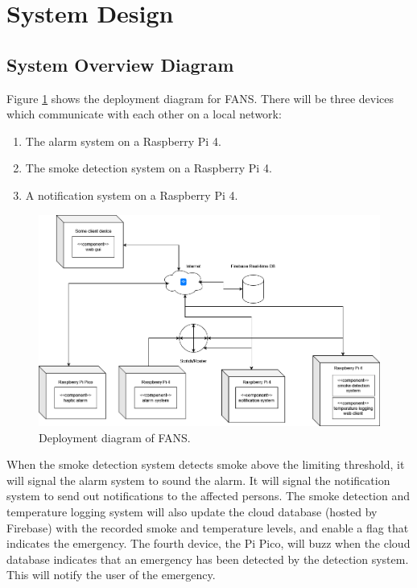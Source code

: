 \section{System Design}

\subsection{System Overview Diagram}

Figure \ref{fig:deployment} shows the deployment diagram for FANS. There will be three devices which communicate with
each other on a local network:

\begin{enumerate}
    \item The alarm system on a Raspberry Pi 4.
    \item The smoke detection system on a Raspberry Pi 4.
    \item A notification system on a Raspberry Pi 4.
\end{enumerate}

\begin{figure}[H]
    \centering
    \includegraphics[width=\linewidth]{../assets/FANSDeployment.png}
    \caption{Deployment diagram of FANS.}
    \label{fig:deployment}
\end{figure}

When the smoke detection system detects smoke above the limiting threshold, it will signal the alarm system to sound
the alarm. It will signal the notification system to send out notifications to the affected persons. The smoke
detection and temperature logging system will also update the cloud database (hosted by Firebase) with the recorded
smoke and temperature levels, and enable a flag that indicates the emergency. The fourth device, the Pi Pico, will buzz
when the cloud database indicates that an emergency has been detected by the detection system. This will notify the
user of the emergency.

